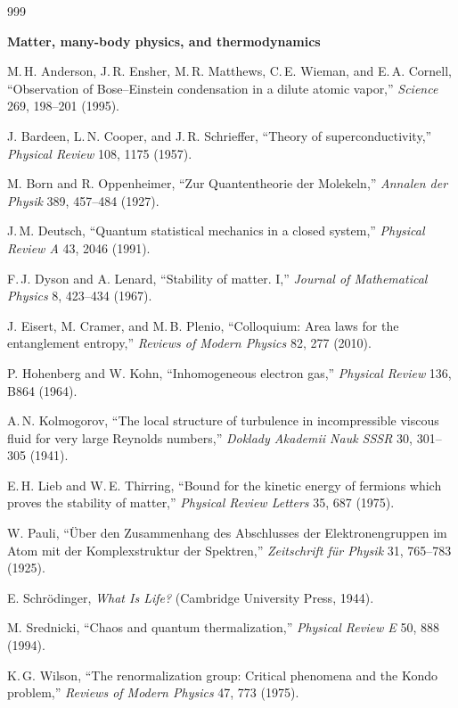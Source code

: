 \begin{thebibliography}{999}
\item[] \textbf{Matter, many-body physics, and thermodynamics}

 M.\,H. Anderson, J.\,R. Ensher, M.\,R. Matthews, C.\,E. Wieman, and E.\,A. Cornell, ``Observation of Bose--Einstein condensation in a dilute atomic vapor,'' \textit{Science} 269, 198--201 (1995).

 J. Bardeen, L.\,N. Cooper, and J.\,R. Schrieffer, ``Theory of superconductivity,'' \textit{Physical Review} 108, 1175 (1957).

 M. Born and R. Oppenheimer, ``Zur Quantentheorie der Molekeln,'' \textit{Annalen der Physik} 389, 457--484 (1927).

 J.\,M. Deutsch, ``Quantum statistical mechanics in a closed system,'' \textit{Physical Review A} 43, 2046 (1991).

 F.\,J. Dyson and A. Lenard, ``Stability of matter. I,'' \textit{Journal of Mathematical Physics} 8, 423--434 (1967).

 J. Eisert, M. Cramer, and M.\,B. Plenio, ``Colloquium: Area laws for the entanglement entropy,'' \textit{Reviews of Modern Physics} 82, 277 (2010).

 P. Hohenberg and W. Kohn, ``Inhomogeneous electron gas,'' \textit{Physical Review} 136, B864 (1964).

 A.\,N. Kolmogorov, ``The local structure of turbulence in incompressible viscous fluid for very large Reynolds numbers,'' \textit{Doklady Akademii Nauk SSSR} 30, 301--305 (1941).

 E.\,H. Lieb and W.\,E. Thirring, ``Bound for the kinetic energy of fermions which proves the stability of matter,'' \textit{Physical Review Letters} 35, 687 (1975).

 W. Pauli, ``\"Uber den Zusammenhang des Abschlusses der Elektronengruppen im Atom mit der Komplexstruktur der Spektren,'' \textit{Zeitschrift f\"ur Physik} 31, 765--783 (1925).

 E. Schr\"odinger, \textit{What Is Life?} (Cambridge University Press, 1944).

 M. Srednicki, ``Chaos and quantum thermalization,'' \textit{Physical Review E} 50, 888 (1994).

 K.\,G. Wilson, ``The renormalization group: Critical phenomena and the Kondo problem,'' \textit{Reviews of Modern Physics} 47, 773 (1975).


\end{thebibliography}
